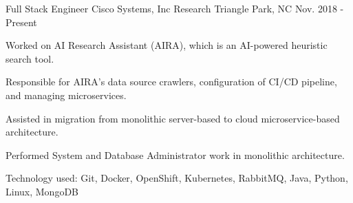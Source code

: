 

\begin{cventries}
  \cventry
    {Full Stack Engineer} %
    {Cisco Systems, Inc} %
    {Research Triangle Park, NC} %
    {Nov. 2018 - Present} %
    {
      \begin{cvitems}
      \item {
          Worked on AI Research Assistant (AIRA), which is an AI-powered
          heuristic search tool.
        }
      \item {
          Responsible for AIRA's data source crawlers, configuration of CI/CD
          pipeline, and managing microservices.
        }
      \item {
          Assisted in migration from monolithic server-based to cloud
          microservice-based architecture.
        }
      \item {
          Performed System and Database Administrator work in monolithic
          architecture.
        }
      \item {
          Technology used: Git, Docker, OpenShift, Kubernetes, RabbitMQ, Java,
          Python, Linux, MongoDB
        }
      \end{cvitems}
    }

\end{cventries}
